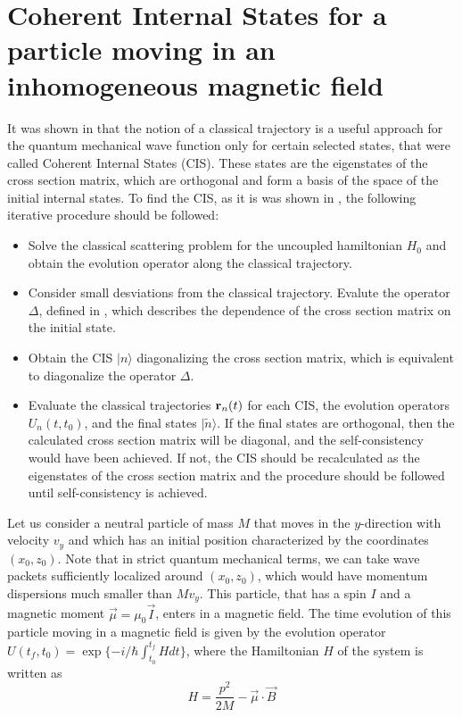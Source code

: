 \documentclass[aps,preprint,prl]{revtex4-2}
\newcommand{\be}{\begin{equation}}
\newcommand{\ee}{\end{equation}}
\begin{document}
\section{Coherent Internal States for  a particle moving in an inhomogeneous
 magnetic field}

It was shown in \cite{sara} that the notion of a classical trajectory is
a useful approach for the quantum mechanical wave function only for
certain selected states, that were called Coherent Internal States (CIS).
These states are the eigenstates of the cross section matrix, 
which are orthogonal and form a basis of the space of the initial internal 
states.
To find the CIS, as it is was shown in \cite{sara}, the 
following iterative procedure should be followed:
\begin{itemize}
\item Solve the classical scattering problem for the uncoupled 
hamiltonian $H_0$ and obtain the 
evolution operator along the classical trajectory. 
\item Consider small desviations from the classical 
trajectory. Evalute the operator $\Delta$, defined in \cite{2}, which
describes the dependence of the cross section matrix on the initial state.
\item Obtain the CIS $|n\rangle$ diagonalizing the cross section matrix, which is
equivalent to diagonalize the operator $\Delta$. 
\item Evaluate the  classical trajectories ${\bf r}_n(t)$ for each CIS, 
the evolution operators $U_n(t,t_0)$, and the final states $|\tilde{n}\rangle$.
If the final states are orthogonal, then the calculated cross section matrix 
will be diagonal, and the self-consistency would have been achieved. 
If not, the CIS should be  recalculated as the eigenstates of the cross section
matrix and the procedure should be followed until self-consistency is achieved.
\end{itemize}

Let us consider a neutral particle of mass $M$ that moves in the $y$-direction 
with velocity $v_y$ and which has an 
initial position characterized by the coordinates $(x_0, z_0)$. Note that
in strict quantum mechanical terms, we can take wave 
packets sufficiently localized around $(x_0, z_0)$, which would have momentum 
dispersions much smaller than $M v_y$.
This particle, that has a spin $I$ and a magnetic moment $\vec \mu = \mu_0
\vec I$, enters in a magnetic field.
The time evolution of this particle moving in a magnetic field is given by the 
evolution operator ${U}(t_f,t_0) = \exp \{-i/\hbar \int_{t_0}^{t_f} {H}
dt \} $, where the Hamiltonian  $ H $ of the system is written as
\be
 H = \frac{p^2}{2M}  - \vec{\mu} \cdot \vec{B}
\label{ham}
\ee 
\end{document}
